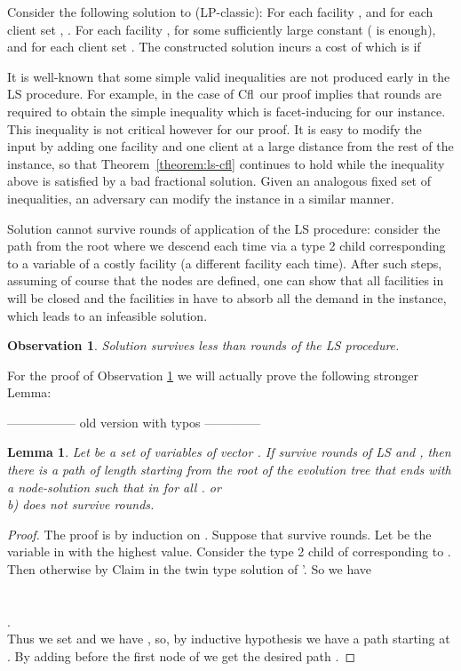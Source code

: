\documentclass[11pt]{article}\usepackage{amsmath}
\newtheorem{lemma}{Lemma}[section]
\newtheorem{observation}{Observation}[section]
\newcommand{\cfl}{{\sc Cfl}}
\begin{document}
Consider  the following solution   to  (LP-classic): For  each
facility      ,    and   for   each   client      set
,  .  For  each  facility    
, for  some sufficiently large 
constant  ( is enough), and  for each
client    set  .  The  constructed  solution  incurs  a  cost  of
 which is  if  

It is well-known that some simple valid 
inequalities are not produced early in the LS procedure.
For example, in the case of \cfl\ 
our proof implies that  rounds
are required to obtain the simple inequality  which is facet-inducing for our instance. 
This inequality is not critical however for our proof. 
It is easy to modify the input by adding one  facility and
one client at a large distance from the rest of the instance, 
so that Theorem~\ref{theorem:ls-cfl} continues to hold 
while the inequality   above is  satisfied by a bad fractional solution.
Given an analogous  fixed set of inequalities, an adversary can modify the
instance in a similar manner. 


Solution   cannot  survive   rounds of  application of  the  LS procedure:
consider the path  from the root where we  descend each time via a  type 2 child
corresponding to  a   variable of a  costly facility (a  different facility
each time).  After  such steps, assuming  of course that the  nodes are defined,
one can show  that all facilities in  will be  closed and the facilities
in   have to absorb  all the  demand in the  instance, which leads  to an
infeasible solution. 


\begin{observation}
\label{observation:l-rounds}
Solution  survives less than  rounds of the LS procedure.
\end{observation}

For the proof of Observation \ref{observation:l-rounds}
we will actually prove the following stronger Lemma:


\iffalse ----------------- old version with typos --------------
\begin{lemma}
Let  be a set of variables  of vector . If 
 survive  rounds of LS and , then
 there is a path  of length  starting from the root  of the evolution tree 
that ends with a node-solution  such that in 
  for all .
or\\
b)  does not survive  rounds.
\end{lemma}

\begin{proof}
The proof is by induction on .
Suppose that  survive  rounds. Let  be the variable in   with
the highest value. Consider the type 2  child of  corresponding to .
Then  otherwise by Claim   in the twin type  solution
 of '. So we have \\
\\
\\
.\\

Thus we set  and we have , so, by inductive hypothesis
 we have a path  starting at . By adding   before the first node  of 
we get the desired path .
\end{proof}
\end{document}
